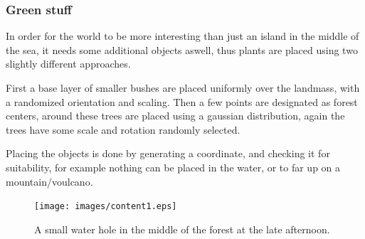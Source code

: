 \subsubsection{Green stuff}
In order for the world to be more interesting than just an island in the middle of the sea, it needs some additional objects aswell, thus plants are placed using two slightly different approaches.

First a base layer of smaller bushes are placed uniformly over the landmass, with a randomized orientation and scaling. Then a few points are designated as forest centers, around these trees are placed using a gaussian distribution, again the trees have some scale and rotation randomly selected.

Placing the objects is done by generating a coordinate, and checking it for suitability, for example nothing can be placed in the water, or to far up on a mountain/voulcano.

\begin{figure}[H]
  \centering
  \texttt{[image: images/content1.eps]}
  \caption{A small water hole in the middle of the forest at the late afternoon.}
  \label{fig:water_hole}
\end{figure}%

